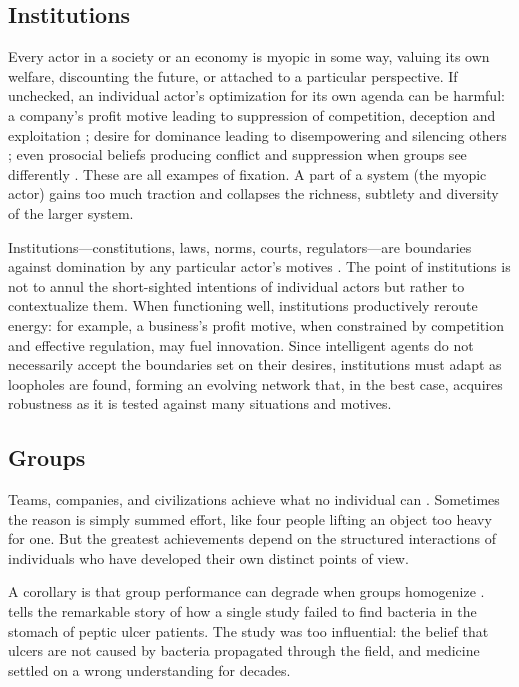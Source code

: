 \documentclass[11pt]{article}
\begin{document}
\subsection{Institutions} 

Every actor in a society or an economy is myopic in some way, valuing its own welfare, discounting the future, or attached to a particular perspective. If unchecked, an individual actor's optimization for its own agenda can be harmful: a company's profit motive leading to suppression of competition, deception and exploitation \citep{bakan2006corporation}; desire for dominance leading to disempowering and silencing others \citep{sidanius2001social}; even prosocial beliefs producing conflict and suppression when groups see differently \citep{haidt2012righteous}. These are all exampes of fixation. A part of a system (the myopic actor) gains too much traction and collapses the richness, subtlety and diversity of the larger system.

Institutions---constitutions, laws, norms, courts, regulators---are boundaries against domination by any particular actor's motives \citep{north1990institutions, ostrom1990governing, leibo2025societal}. The point of institutions is not to annul the short-sighted intentions of individual actors but rather to contextualize them. When functioning well, institutions productively reroute energy: for example, a business's profit motive, when constrained by competition and effective regulation, may fuel innovation. Since intelligent agents do not necessarily accept the boundaries set on their desires, institutions must adapt as loopholes are found, forming an evolving network that, in the best case, acquires robustness as it is tested against many situations and motives.


\subsection{Groups} 

Teams, companies, and civilizations achieve what no individual can \citep{woolley2010evidence, hutchins1995cognition}. Sometimes the reason is simply summed effort, like four people lifting an object too heavy for one. But the greatest achievements depend on the structured interactions of individuals who have developed their own distinct points of view.

A corollary is that group performance can degrade when groups homogenize \citep{lorenz2011social, lazer2007network, hong2004groups, frey2021social, janis1972victims, bernstein2018intermittent}. \cite{zollman2010epistemic} tells the remarkable story of how a single study failed to find bacteria in the stomach of peptic ulcer patients. The study was too influential: the belief that ulcers are not caused by bacteria propagated through the field, and medicine settled on a wrong understanding for decades.
\end{document}
